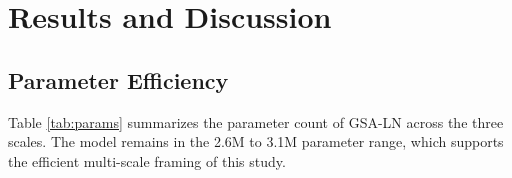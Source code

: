 \documentclass[conference]{IEEEtran}
\begin{document}

\section{Results and Discussion}

\subsection{Parameter Efficiency}

Table \ref{tab:params} summarizes the parameter count of GSA-LN across the three scales. The model remains in the 2.6M to 3.1M parameter range, which supports the efficient multi-scale framing of this study.
\end{document}
